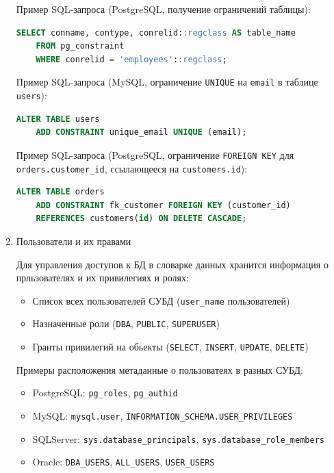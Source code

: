 \begin{enumerate}
    Пример SQL-запроса (PostgreSQL, получение ограничений таблицы):
    \begin{lstlisting}[language=SQL]
    SELECT conname, contype, conrelid::regclass AS table_name 
    FROM pg_constraint 
    WHERE conrelid = 'employees'::regclass; 
    \end{lstlisting}

    Пример SQL-запроса (MySQL, ограничение \texttt{UNIQUE} на \texttt{email} в таблице \texttt{users}):
    \begin{lstlisting}[language=SQL]
    ALTER TABLE users
    ADD CONSTRAINT unique_email UNIQUE (email);    
    \end{lstlisting}

    Пример SQL-запроса (PostgreSQL, ограничение \texttt{FOREIGN KEY} для \texttt{orders.customer\_id}, ссылающееся на \texttt{customers.id}):
    \begin{lstlisting}[language=SQL]
    ALTER TABLE orders
    ADD CONSTRAINT fk_customer FOREIGN KEY (customer_id)
    REFERENCES customers(id) ON DELETE CASCADE;
    \end{lstlisting}

    \item Пользователи и их правами \autocite{MicrosoftLearnSQLserverPerm, oracledbdoc3}

    Для управления доступов к БД в словарке данных хранится информация о прльзователях и их привилегиях и ролях:
    \begin{itemize}
        \item Список всех пользователей СУБД (\texttt{user\_name} пользователей)
        \item Назначенные роли (\texttt{DBA}, \texttt{PUBLIC}, \texttt{SUPERUSER})
        \item Гранты привилегий на обьекты (\texttt{SELECT}, \texttt{INSERT}, \texttt{UPDATE}, \texttt{DELETE})
    \end{itemize}

    Примеры расположения метаданные о пользоватеях в разных СУБД:

    \begin{itemize}
        \item PostgreSQL: \texttt{pg\_roles}, \texttt{pg\_authid}
        \item MySQL: \texttt{mysql.user}, \texttt{INFORMATION\_SCHEMA.USER\_PRIVILEGES}
        \item SQLServer: \texttt{sys.database\_principals}, \texttt{sys.database\_role\_members}
        \item Oracle: \texttt{DBA\_USERS}, \texttt{ALL\_USERS}, \texttt{USER\_USERS}
    \end{itemize}


\end{enumerate}
